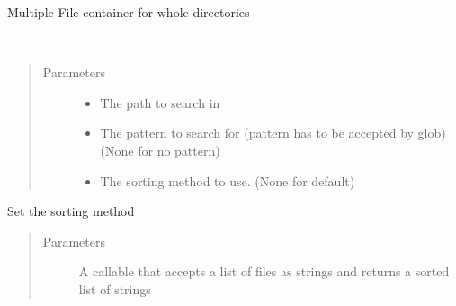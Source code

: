 \documentclass[letterpaper,10pt,openany,oneside,english]{sphinxmanual}
\begin{document}
\begin{fulllineitems}
\label{\detokenize{file:file.MultiFile}}
Multiple File container for whole directories

\begin{fulllineitems}
\label{\detokenize{file:file.MultiFile.__init__}}~\begin{quote}\begin{description}
\item[{Parameters}] \leavevmode\begin{itemize}
\item {} 
 \textendash{} The path to search in

\item {} 
 \textendash{} The pattern to search for (pattern has to be accepted by glob) (None for no pattern)

\item {} 
 \textendash{} The sorting method to use. (None for default)

\end{itemize}

\end{description}\end{quote}

\end{fulllineitems}


\begin{fulllineitems}
\label{\detokenize{file:file.MultiFile.set_sorter}}
Set the sorting method
\begin{quote}\begin{description}
\item[{Parameters}] \leavevmode
{} \textendash{} A callable that accepts a list of files as strings and returns a sorted list of strings

\end{description}\end{quote}

\end{fulllineitems}


\end{fulllineitems}
\end{document}
